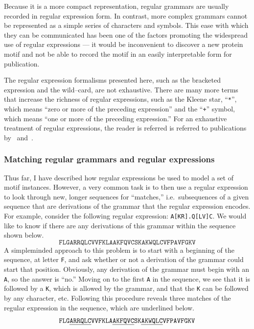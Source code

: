 Because it is a more compact representation, regular grammars are
usually recorded in regular expression form.  In contrast, more
complex grammars cannot be represented as a simple series of
characters and symbols.  This ease with which they can be
communicated has been one of the factors promoting the widespread
use of regular expressions --- it would be inconvenient to discover
a new protein motif and not be able to record the motif in an easily
interpretable form for publication.

The regular expression formalisms presented here, such as the
bracketed expression and the wild--card, are not exhaustive.  There
are many more terms that increase the richness of regular
expressions, such as the Kleene star, ``\texttt{*}'', which means
``zero or more of the preceding expression'' and the ``\texttt{+}''
symbol, which means ``one or more of the preceding expression.'' For
an exhaustive treatment of regular expressions, the reader is
referred is referred to publications
by~\citet{sipser1997introduction} and~\citet{friedl1997mastering}.

\subsubsection*{Matching regular grammars and regular expressions}

Thus far, I have described how regular expressions be used
to model a set of motif instances.  However, a very common task is
to then use a regular expression to look through new, longer
sequences for ``matches,'' i.e.\ subsequences of a given sequence
that are derivations of the grammar that the regular expression
encodes.  For example, consider the following regular expression:
\texttt{A[KR].Q[LV]C}.  We would like to know if there are any
derivations of this grammar within the sequence shown below.
\begin{equation}\label{eqn:randseq}
    \texttt{FLGARRQLCVVFKLAAKFQVCSKAKWQLCVFPAVFGKV}
\end{equation}
A simpleminded approach to this problem is to start with a beginning
of the sequence, at letter \texttt{F}, and ask whether or not a
derivation of the grammar could start that position.  Obviously, any
derivation of the grammar must begin with an \texttt{A}, so the
answer is ``no.''  Moving on to the first \texttt{A} in the
sequence, we see that it is followed by a \texttt{K}, which is
allowed by the grammar, and that the \texttt{K} can be followed by
any character, etc. Following this procedure reveals three matches
of the regular expression in the sequence, which are underlined
below.
\begin{equation}\label{eqn:randseq2}
    \texttt{FLG\uline{ARRQLC}VVFKLA\uline{AKFQVC}SK\uline{AKWQLC}VFPAVFGKV}
\end{equation}

